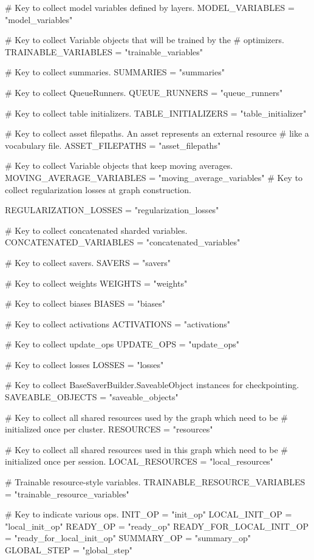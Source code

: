 \begin{content}
\begin{leftbar}
\begin{python}
  # Key to collect model variables defined by layers.
  MODEL_VARIABLES = "model_variables"

  # Key to collect Variable objects that will be trained by the
  # optimizers.
  TRAINABLE_VARIABLES = "trainable_variables"

  # Key to collect summaries.
  SUMMARIES = "summaries"

  # Key to collect QueueRunners.
  QUEUE_RUNNERS = "queue_runners"

  # Key to collect table initializers.
  TABLE_INITIALIZERS = "table_initializer"

  # Key to collect asset filepaths. An asset represents an external resource
  # like a vocabulary file.
  ASSET_FILEPATHS = "asset_filepaths"

  # Key to collect Variable objects that keep moving averages.
  MOVING_AVERAGE_VARIABLES = "moving_average_variables"
  # Key to collect regularization losses at graph construction.

  REGULARIZATION_LOSSES = "regularization_losses"

  # Key to collect concatenated sharded variables.
  CONCATENATED_VARIABLES = "concatenated_variables"

  # Key to collect savers.
  SAVERS = "savers"

  # Key to collect weights
  WEIGHTS = "weights"

  # Key to collect biases
  BIASES = "biases"

  # Key to collect activations
  ACTIVATIONS = "activations"

  # Key to collect update\_ops
  UPDATE_OPS = "update_ops"

  # Key to collect losses
  LOSSES = "losses"

  # Key to collect BaseSaverBuilder.SaveableObject instances for checkpointing.
  SAVEABLE_OBJECTS = "saveable_objects"

  # Key to collect all shared resources used by the graph which need to be
  # initialized once per cluster.
  RESOURCES = "resources"

  # Key to collect all shared resources used in this graph which need to be
  # initialized once per session.
  LOCAL_RESOURCES = "local_resources"

  # Trainable resource-style variables.
  TRAINABLE_RESOURCE_VARIABLES = "trainable_resource_variables"

  # Key to indicate various ops.
  INIT_OP = "init_op"
  LOCAL_INIT_OP = "local_init_op"
  READY_OP = "ready_op"
  READY_FOR_LOCAL_INIT_OP = "ready_for_local_init_op"
  SUMMARY_OP = "summary_op"
  GLOBAL_STEP = "global_step"


\end{python}
\end{leftbar}
\end{content}
